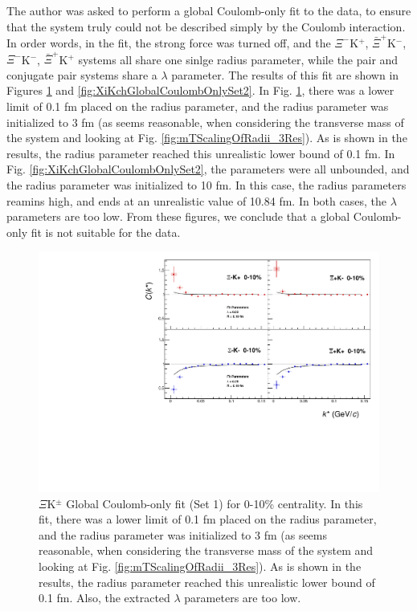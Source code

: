 \documentclass[/home/jesse/Analysis/FemtoAnalysis/AnalysisNotes/AnalysisNoteJBuxton.tex]{subfiles}
\begin{document}
The author was asked to perform a global Coulomb-only fit to the data, to ensure that the system truly could not be described simply by the Coulomb interaction.  In order words, in the fit, the strong force was turned off, and the $\Xi^{-}$K$^{+}$, $\bar{\Xi}^{+}$K$^{-}$, $\Xi^{-}$K$^{-}$, $\bar{\Xi}^{+}$K$^{+}$ systems all share one sinlge radius parameter, while the pair and conjugate pair systems share a $\lambda$ parameter.  The results of this fit are shown in Figures \ref{fig:XiKchGlobalCoulombOnlySet1} and \ref{fig:XiKchGlobalCoulombOnlySet2}.  In Fig. \ref{fig:XiKchGlobalCoulombOnlySet1}, there was a lower limit of 0.1 fm placed on the radius parameter, and the radius parameter was initialized to 3 fm (as seems reasonable, when considering the transverse mass of the system and looking at Fig. \ref{fig:mTScalingOfRadii_3Res}).  As is shown in the results, the radius parameter reached this unrealistic lower bound of 0.1 fm.  In Fig. \ref{fig:XiKchGlobalCoulombOnlySet2}, the parameters were all unbounded, and the radius parameter was initialized to 10 fm.  In this case, the radius parameters reamins high, and ends at an unrealistic value of 10.84 fm.  In both cases, the $\lambda$ parameters are too low.  From these figures, we conclude that a global Coulomb-only fit is not suitable for the data.

\begin{figure}[h]
  \centering
  \includegraphics[width=\textwidth]{7_ResultsAndDiscussion/Figures/GlobalCoulombOnlyFit_Set1.pdf}
  \caption[$\Xi$K$^{\pm}$ Global Coulomb-Only Fit (Set 1)]{$\Xi$K$^{\pm}$ Global Coulomb-only fit (Set 1) for 0-10\% centrality.  In this fit, there was a lower limit of 0.1 fm placed on the radius parameter, and the radius parameter was initialized to 3 fm (as seems reasonable, when considering the transverse mass of the system and looking at Fig. \ref{fig:mTScalingOfRadii_3Res}).  As is shown in the results, the radius parameter reached this unrealistic lower bound of 0.1 fm.  Also, the extracted $\lambda$ parameters are too low.}
  \label{fig:XiKchGlobalCoulombOnlySet1}
\end{figure}
\end{document}
